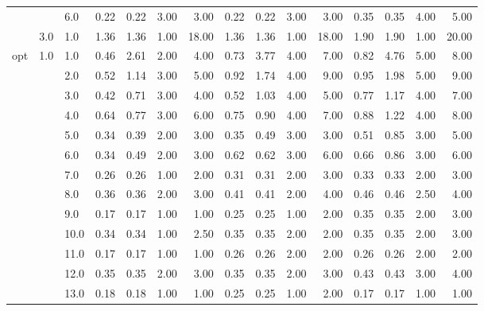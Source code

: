 \begin{tabular}{lllrrrrrrrrrrrr}
    &     & 6.0  &       0.22 &      0.22 & 3.00 &   3.00 &       0.22 &      0.22 & 3.00 &   3.00 &       0.35 &      0.35 & 4.00 &   5.00 \\
    & 3.0 & 1.0  &       1.36 &      1.36 & 1.00 &  18.00 &       1.36 &      1.36 & 1.00 &  18.00 &       1.90 &      1.90 & 1.00 &  20.00 \\
opt & 1.0 & 1.0  &       0.46 &      2.61 & 2.00 &   4.00 &       0.73 &      3.77 & 4.00 &   7.00 &       0.82 &      4.76 & 5.00 &   8.00 \\
    &     & 2.0  &       0.52 &      1.14 & 3.00 &   5.00 &       0.92 &      1.74 & 4.00 &   9.00 &       0.95 &      1.98 & 5.00 &   9.00 \\
    &     & 3.0  &       0.42 &      0.71 & 3.00 &   4.00 &       0.52 &      1.03 & 4.00 &   5.00 &       0.77 &      1.17 & 4.00 &   7.00 \\
    &     & 4.0  &       0.64 &      0.77 & 3.00 &   6.00 &       0.75 &      0.90 & 4.00 &   7.00 &       0.88 &      1.22 & 4.00 &   8.00 \\
    &     & 5.0  &       0.34 &      0.39 & 2.00 &   3.00 &       0.35 &      0.49 & 3.00 &   3.00 &       0.51 &      0.85 & 3.00 &   5.00 \\
    &     & 6.0  &       0.34 &      0.49 & 2.00 &   3.00 &       0.62 &      0.62 & 3.00 &   6.00 &       0.66 &      0.86 & 3.00 &   6.00 \\
    &     & 7.0  &       0.26 &      0.26 & 1.00 &   2.00 &       0.31 &      0.31 & 2.00 &   3.00 &       0.33 &      0.33 & 2.00 &   3.00 \\
    &     & 8.0  &       0.36 &      0.36 & 2.00 &   3.00 &       0.41 &      0.41 & 2.00 &   4.00 &       0.46 &      0.46 & 2.50 &   4.00 \\
    &     & 9.0  &       0.17 &      0.17 & 1.00 &   1.00 &       0.25 &      0.25 & 1.00 &   2.00 &       0.35 &      0.35 & 2.00 &   3.00 \\
    &     & 10.0 &       0.34 &      0.34 & 1.00 &   2.50 &       0.35 &      0.35 & 2.00 &   2.00 &       0.35 &      0.35 & 2.00 &   3.00 \\
    &     & 11.0 &       0.17 &      0.17 & 1.00 &   1.00 &       0.26 &      0.26 & 2.00 &   2.00 &       0.26 &      0.26 & 2.00 &   2.00 \\
    &     & 12.0 &       0.35 &      0.35 & 2.00 &   3.00 &       0.35 &      0.35 & 2.00 &   3.00 &       0.43 &      0.43 & 3.00 &   4.00 \\
    &     & 13.0 &       0.18 &      0.18 & 1.00 &   1.00 &       0.25 &      0.25 & 1.00 &   2.00 &       0.17 &      0.17 & 1.00 &   1.00 \\

\end{tabular}
